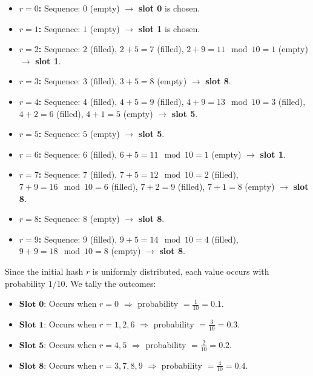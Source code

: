\documentclass{article}
\begin{document}
\begin{itemize}
    \item \textbf{\(r=0\):} Sequence: \(0\) (empty) \(\to\) \textbf{slot 0} is chosen.
    \item \textbf{\(r=1\):} Sequence: \(1\) (empty) \(\to\) \textbf{slot 1} is chosen.
    \item \textbf{\(r=2\):} Sequence: \(2\) (filled), \(2+5=7\) (filled), \(2+9=11 \mod 10=1\) (empty) \(\to\) \textbf{slot 1}.
    \item \textbf{\(r=3\):} Sequence: \(3\) (filled), \(3+5=8\) (empty) \(\to\) \textbf{slot 8}.
    \item \textbf{\(r=4\):} Sequence: \(4\) (filled), \(4+5=9\) (filled), \(4+9=13 \mod 10=3\) (filled), \(4+2=6\) (filled), \(4+1=5\) (empty) \(\to\) \textbf{slot 5}.
    \item \textbf{\(r=5\):} Sequence: \(5\) (empty) \(\to\) \textbf{slot 5}.
    \item \textbf{\(r=6\):} Sequence: \(6\) (filled), \(6+5=11 \mod 10=1\) (empty) \(\to\) \textbf{slot 1}.
    \item \textbf{\(r=7\):} Sequence: \(7\) (filled), \(7+5=12 \mod 10=2\) (filled), \(7+9=16 \mod 10=6\) (filled), \(7+2=9\) (filled), \(7+1=8\) (empty) \(\to\) \textbf{slot 8}.
    \item \textbf{\(r=8\):} Sequence: \(8\) (empty) \(\to\) \textbf{slot 8}.
    \item \textbf{\(r=9\):} Sequence: \(9\) (filled), \(9+5=14 \mod 10=4\) (filled), \(9+9=18 \mod 10=8\) (empty) \(\to\) \textbf{slot 8}.
\end{itemize}

Since the initial hash \(r\) is uniformly distributed, each value occurs with probability \(1/10\). We tally the outcomes:
\begin{itemize}
    \item \(\textbf{Slot 0:}\) Occurs when \(r=0\) \(\Rightarrow\) probability \(= \frac{1}{10}=0.1.\)
    \item \(\textbf{Slot 1:}\) Occurs when \(r=1,2,6\) \(\Rightarrow\) probability \(= \frac{3}{10}=0.3.\)
    \item \(\textbf{Slot 5:}\) Occurs when \(r=4,5\) \(\Rightarrow\) probability \(= \frac{2}{10}=0.2.\)
    \item \(\textbf{Slot 8:}\) Occurs when \(r=3,7,8,9\) \(\Rightarrow\) probability \(= \frac{4}{10}=0.4.\)
\end{itemize}
\end{document}
